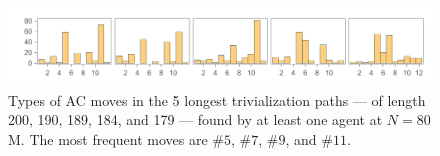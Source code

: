 \begin{figure}[h]
    \centering
	\includegraphics[scale=0.6]{fig/anatomy_some.png}
	\caption{Types of AC moves in the 5 longest trivialization paths --- of length 200, 190, 189, 184, and 179 --- found by at least one agent at $N=80$M. The most frequent moves are $\# 5$, $\# 7$, $\# 9$, and $\# 11$.}
	\label{fig:anatomy_some}
\end{figure}


